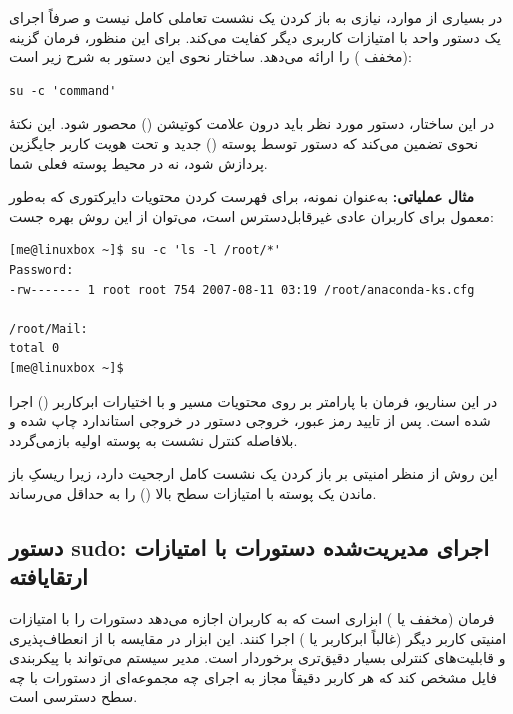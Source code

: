 در بسیاری از موارد، نیازی به باز کردن یک نشست تعاملی کامل نیست و صرفاً اجرای یک دستور واحد با امتیازات کاربری دیگر کفایت می‌کند. برای این منظور، فرمان  گزینه  (مخفف ) را ارائه می‌دهد. ساختار نحوی این دستور به شرح زیر است:

\begin{latin}
\begin{lstlisting}
su -c 'command'
\end{lstlisting}
\end{latin}

در این ساختار، دستور مورد نظر باید درون علامت کوتیشن () محصور شود. این نکتهٔ نحوی تضمین می‌کند که دستور توسط پوسته () جدید و تحت هویت کاربر جایگزین پردازش شود، نه در محیط پوسته فعلی شما.

\textbf{مثال عملیاتی:} به‌عنوان نمونه، برای فهرست کردن محتویات دایرکتوری  که به‌طور معمول برای کاربران عادی غیرقابل‌دسترس است، می‌توان از این روش بهره جست:

\begin{latin}
\begin{lstlisting}
[me@linuxbox ~]$ su -c 'ls -l /root/*'
Password:
-rw------- 1 root root 754 2007-08-11 03:19 /root/anaconda-ks.cfg

/root/Mail:
total 0
[me@linuxbox ~]$
\end{lstlisting}
\end{latin}

در این سناریو، فرمان  با پارامتر  بر روی محتویات مسیر  و با اختیارات ابرکاربر () اجرا شده است. پس از تایید رمز عبور، خروجی دستور در خروجی استاندارد چاپ شده و بلافاصله کنترل نشست به پوسته اولیه بازمی‌گردد.

این روش از منظر امنیتی بر باز کردن یک نشست کامل ارجحیت دارد، زیرا ریسکِ باز ماندن یک پوسته با امتیازات سطح بالا () را به حداقل می‌رساند.

\subsection{دستور sudo: اجرای مدیریت‌شده دستورات با امتیازات ارتقایافته}

فرمان  (مخفف  یا ) ابزاری است که به کاربران اجازه می‌دهد دستورات را با امتیازات امنیتی کاربر دیگر (غالباً ابرکاربر یا ) اجرا کنند. این ابزار در مقایسه با  از انعطاف‌پذیری و قابلیت‌های کنترلی بسیار دقیق‌تری برخوردار است. مدیر سیستم می‌تواند با پیکربندی فایل  مشخص کند که هر کاربر دقیقاً مجاز به اجرای چه مجموعه‌ای از دستورات با چه سطح دسترسی است.

